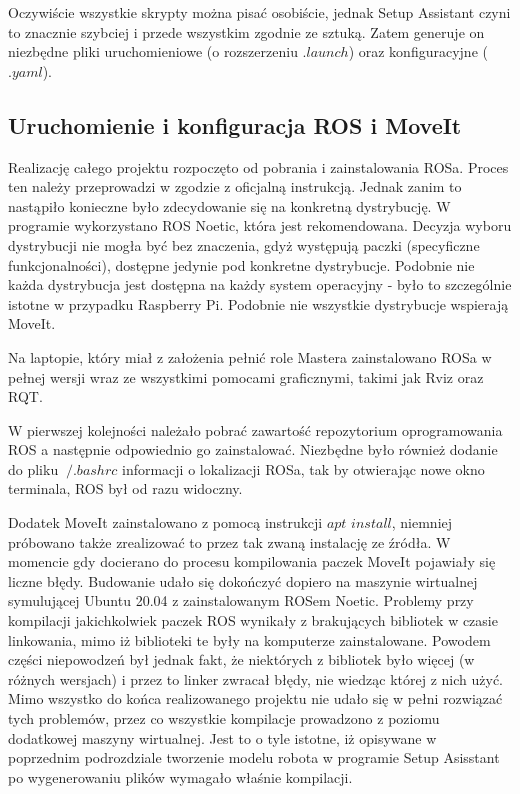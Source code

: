 Oczywiście wszystkie skrypty można pisać osobiście, jednak Setup Assistant czyni to znacznie szybciej i przede wszystkim zgodnie ze sztuką. Zatem generuje on niezbędne pliki uruchomieniowe (o rozszerzeniu $.launch$) oraz konfiguracyjne ($.yaml$).

\subsection{Uruchomienie i konfiguracja ROS i MoveIt}

Realizację całego projektu rozpoczęto od pobrania i zainstalowania ROSa. Proces ten należy przeprowadzi w zgodzie z oficjalną instrukcją. Jednak zanim to nastąpiło konieczne było zdecydowanie się na konkretną dystrybucję. W programie wykorzystano ROS Noetic, która jest rekomendowana. Decyzja wyboru dystrybucji nie mogła być bez znaczenia, gdyż występują paczki (specyficzne funkcjonalności), dostępne jedynie pod konkretne dystrybucje. Podobnie nie każda dystrybucja jest dostępna na każdy system operacyjny - było to szczególnie istotne w przypadku Raspberry Pi. Podobnie nie wszystkie dystrybucje wspierają MoveIt. 

Na laptopie, który miał z założenia pełnić role Mastera zainstalowano ROSa w pełnej wersji wraz ze wszystkimi pomocami graficznymi, takimi jak Rviz oraz RQT.


W pierwszej kolejności należało pobrać zawartość repozytorium oprogramowania ROS a następnie odpowiednio go zainstalować. Niezbędne było również dodanie do pliku $~/.bashrc$ informacji o lokalizacji ROSa, tak by otwierając nowe okno terminala, ROS był od razu widoczny.

Dodatek MoveIt zainstalowano z pomocą instrukcji $apt$ $install$, niemniej próbowano także zrealizować to przez tak zwaną instalację ze źródła. W momencie gdy docierano do procesu kompilowania paczek MoveIt pojawiały się liczne błędy. Budowanie udało się dokończyć dopiero na maszynie wirtualnej symulującej Ubuntu 20.04 z zainstalowanym ROSem Noetic. Problemy przy kompilacji jakichkolwiek paczek ROS wynikały z brakujących bibliotek w czasie linkowania, mimo iż biblioteki te były na komputerze zainstalowane. Powodem części niepowodzeń był jednak fakt, że niektórych z bibliotek było więcej (w różnych wersjach) i przez to linker zwracał błędy, nie wiedząc której z nich użyć. Mimo wszystko do końca realizowanego projektu nie udało się w pełni rozwiązać tych problemów, przez co wszystkie kompilacje prowadzono z poziomu dodatkowej maszyny wirtualnej. Jest to o tyle istotne, iż opisywane w poprzednim podrozdziale tworzenie modelu robota w programie Setup Asisstant po wygenerowaniu plików wymagało właśnie kompilacji.

